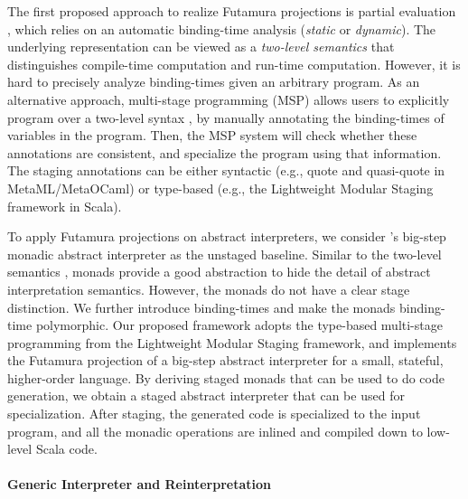 The first proposed approach to realize Futamura projections is partial
evaluation \cite{DBLP:books/daglib/0072559}, which relies on an automatic
binding-time analysis (\textit{static} or \textit{dynamic}).  The underlying
representation can be viewed as a \textit{two-level semantics}
\cite{NIELSON1989117, NIELSON198859} that distinguishes compile-time
computation and run-time computation.
However, it is hard to precisely analyze binding-times given an arbitrary
program. As an alternative approach, multi-stage programming (MSP)
\cite{taha1999multi, DBLP:conf/pepm/TahaS97} allows users to explicitly program over
a two-level syntax \cite{Nielson:1992:TFL:130665}, by manually
annotating the binding-times of variables in the program. Then, the MSP system
will check whether these annotations are consistent, and specialize the program
using that information. The staging annotations can be either syntactic (e.g.,
quote and quasi-quote in MetaML/MetaOCaml) or type-based (e.g., the Lightweight
Modular Staging framework \cite{DBLP:conf/gpce/RompfO10} in Scala).

To apply Futamura projections on abstract interpreters, we consider
\citet{DBLP:journals/pacmpl/DaraisLNH17}'s big-step monadic abstract
interpreter as the unstaged baseline.  Similar to the two-level semantics
\cite{NIELSON1989117}, monads provide a good abstraction to hide the detail of
abstract interpretation semantics. However, the monads do not have a clear
stage distinction.
We further introduce binding-times and make the monads binding-time polymorphic.
Our proposed framework adopts the type-based multi-stage programming from the
Lightweight Modular Staging framework, and implements the Futamura projection
of a big-step abstract interpreter for a small, stateful, higher-order
language. By deriving staged monads that can be used to do code generation, we
obtain a staged abstract interpreter that can be used for specialization. After
staging, the generated code is specialized to the input program, and all the
monadic operations are inlined and compiled down to low-level Scala code.



\paragraph{Generic Interpreter and Reinterpretation}

